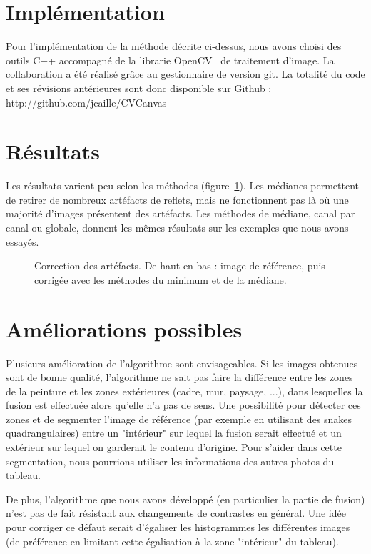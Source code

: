 \documentclass[12pt,a4paper]{article}
\begin{document}
\section{Implémentation}

Pour l'implémentation de la méthode décrite ci-dessus, nous avons choisi des outils C++ accompagné de la librarie OpenCV~\citep{opencv_library} de traitement d'image. La collaboration a été réalisé grâce au gestionnaire de version git. La totalité du code et ses révisions antérieures sont donc disponible sur Github : http://github.com/jcaille/CVCanvas

\section{Résultats}
Les résultats varient peu selon les méthodes (figure~\ref{mediane}). Les médianes permettent de retirer de nombreux artéfacts de reflets, mais ne fonctionnent pas là où une majorité d'images présentent des artéfacts. Les méthodes de médiane, canal par canal ou globale, donnent les mêmes résultats sur les exemples que nous avons essayés.
\begin{figure}
\centering
\begin{minipage}{0.6\linewidth}
\end{minipage}
\begin{minipage}{0.6\linewidth}
\end{minipage}
\begin{minipage}{0.6\linewidth}
\end{minipage}
\caption{Correction des artéfacts. De haut en bas : image de référence, puis corrigée avec les méthodes du minimum et de la médiane.}
\label{mediane}
\end{figure} 
\section{Améliorations possibles}

Plusieurs amélioration de l'algorithme sont envisageables. Si les images obtenues sont de bonne qualité, l'algorithme ne sait pas faire la différence entre les zones de la peinture et les zones extérieures (cadre, mur, paysage, ...), dans lesquelles la fusion est effectuée alors qu'elle n'a pas de sens. Une possibilité pour détecter ces zones et de segmenter l'image de référence (par exemple en utilisant des snakes quadrangulaires) entre un "intérieur" sur lequel la fusion serait effectué et un extérieur sur lequel on garderait le contenu d'origine. Pour s'aider dans cette segmentation, nous pourrions utiliser les informations des autres photos du tableau.

De plus, l'algorithme que nous avons développé (en particulier la partie de fusion) n'est pas de fait résistant aux changements de contrastes en général. Une idée pour corriger ce défaut serait d'égaliser les histogrammes les différentes images (de préférence en limitant cette égalisation à la zone "intérieur" du tableau).


\end{document}
